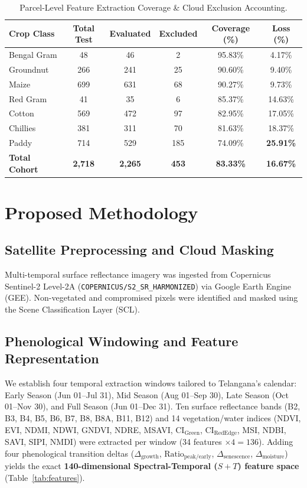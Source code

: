 \documentclass[runningheads]{llncs}
\begin{document}
\begin{table}[t]
\centering
\caption{Parcel-Level Feature Extraction Coverage \& Cloud Exclusion Accounting.}
\label{tab:cloud}
\small
\begin{tabular}{lccccc}
\toprule
\textbf{Crop Class} & \textbf{Total Test} & \textbf{Evaluated} & \textbf{Excluded} & \textbf{Coverage (\%)} & \textbf{Loss (\%)} \\
\midrule
Bengal Gram & 48 & 46 & 2 & 95.83\% & 4.17\% \\
Groundnut & 266 & 241 & 25 & 90.60\% & 9.40\% \\
Maize & 699 & 631 & 68 & 90.27\% & 9.73\% \\
Red Gram & 41 & 35 & 6 & 85.37\% & 14.63\% \\
Cotton & 569 & 472 & 97 & 82.95\% & 17.05\% \\
Chillies & 381 & 311 & 70 & 81.63\% & 18.37\% \\
Paddy & 714 & 529 & 185 & 74.09\% & \textbf{25.91\%} \\
\midrule
\textbf{Total Cohort} & \textbf{2,718} & \textbf{2,265} & \textbf{453} & \textbf{83.33\%} & \textbf{16.67\%} \\
\bottomrule
\end{tabular}
\end{table}

\section{Proposed Methodology}
\subsection{Satellite Preprocessing and Cloud Masking}
Multi-temporal surface reflectance imagery was ingested from Copernicus Sentinel-2 Level-2A (\texttt{COPERNICUS/S2\_SR\_HARMONIZED}) via Google Earth Engine (GEE). Non-vegetated and compromised pixels were identified and masked using the Scene Classification Layer (SCL).

\subsection{Phenological Windowing and Feature Representation}
We establish four temporal extraction windows tailored to Telangana's calendar: Early Season (Jun 01--Jul 31), Mid Season (Aug 01--Sep 30), Late Season (Oct 01--Nov 30), and Full Season (Jun 01--Dec 31). Ten surface reflectance bands (B2, B3, B4, B5, B6, B7, B8, B8A, B11, B12) and 14 vegetation/water indices (NDVI, EVI, NDMI, NDWI, GNDVI, NDRE, MSAVI, CI$_\text{Green}$, CI$_\text{RedEdge}$, MSI, NDBI, SAVI, SIPI, NMDI) were extracted per window (34 features $\times 4 = 136$). Adding four phenological transition deltas ($\Delta_\text{growth}$, $\text{Ratio}_\text{peak/early}$, $\Delta_\text{senescence}$, $\Delta_\text{moisture}$) yields the exact \textbf{140-dimensional Spectral-Temporal ($S+T$) feature space} (Table~\ref{tab:features}).
\end{document}
